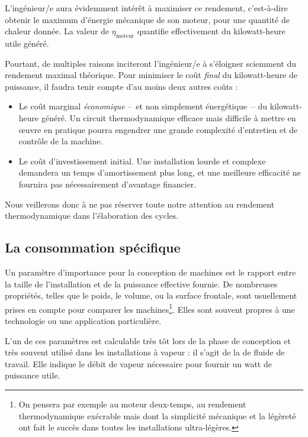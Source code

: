 		L’ingénieur/e aura évidemment intérêt à maximiser ce rendement, c’est-à-dire obtenir le maximum d’énergie mécanique de son moteur, pour une quantité de chaleur donnée. La valeur de $\eta_\text{moteur}$  quantifie effectivement  du kilowatt-heure utile généré.

		Pourtant, de multiples raisons inciteront l’ingénieur/e à s’éloigner sciemment du rendement maximal théorique. Pour minimiser le coût \emph{final} du kilowatt-heure de puissance, il faudra tenir compte d’au moins deux autres coûts :

		\begin{itemize}
			\item Le coût marginal \emph{économique} --\ et non simplement énergétique\ -- du kilowatt-heure généré. Un circuit thermodynamique efficace mais difficile à mettre en œuvre en pratique pourra engendrer une grande complexité d’entretien et de contrôle de la machine.
			\item Le coût d’investissement initial. Une installation lourde et complexe demandera un temps d’amortissement plus long, et une meilleure efficacité ne fournira pas nécessairement d’avantage financier.
		\end{itemize}

		Nous veillerons donc à ne pas réserver toute notre attention au rendement thermodynamique dans l’élaboration des cycles.



	\subsection{La consommation spécifique}
	\label{ch_SSC}

		Un paramètre d’importance pour la conception de machines est le rapport entre la taille de l’installation et de la puissance effective fournie. De nombreuses propriétés, telles que le poids, le volume, ou la surface frontale, sont usuellement prises en compte pour comparer les machines\footnote{On pensera par exemple au moteur deux-temps, au rendement thermodynamique exécrable mais dont la simplicité mécanique et la légèreté ont fait le succès dans toutes les installations ultra-légères.}.	Elles sont souvent propres à une technologie ou une application particulière.

		L’un de ces paramètres est calculable très tôt lors de la phase de conception et très souvent utilisé dans les installations à vapeur : il s’agit de la  de fluide de travail. Elle indique le débit de vapeur nécessaire pour fournir un watt de puissance utile.

